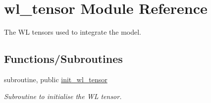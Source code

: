 \hypertarget{namespacewl__tensor}{}\section{wl\+\_\+tensor Module Reference}
\label{namespacewl__tensor}


The WL tensors used to integrate the model.  


\subsection*{Functions/\+Subroutines}
\begin{DoxyCompactItemize}
\item 
subroutine, public \hyperlink{namespacewl__tensor_a7879231bc9a7529024797ff81ade5fc3}{init\+\_\+wl\+\_\+tensor}
\begin{DoxyCompactList}\small\item\em Subroutine to initialise the WL tensor. \end{DoxyCompactList}\end{DoxyCompactItemize}
